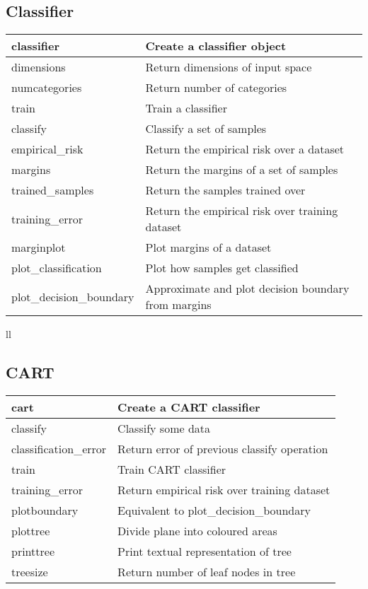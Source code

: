 \subsection{Classifier}

\begin{tabular}{ll}
\hline
classifier		& Create a classifier object \\
\hline	
dimensions		& Return dimensions of input space \\		
numcategories		& Return number of categories \\
\hline
train			& Train a classifier \\
classify		& Classify a set of samples \\
empirical\_risk		& Return the empirical risk over a dataset \\
margins			& Return the margins of a set of samples \\
\hline
trained\_samples		& Return the samples trained over \\
training\_error		& Return the empirical risk over training dataset \\
\hline
marginplot		& Plot margins of a dataset \\
plot\_classification	& Plot how samples get classified \\
plot\_decision\_boundary	& Approximate and plot decision boundary from margins \\
\hline
\end{tabular}{ll}


\subsection{CART}

\begin{tabular}{ll}
\hline
cart			& Create a CART classifier \\
\hline
classify		& Classify some data \\
classification\_error	& Return error of previous classify operation \\
\hline
train			& Train CART classifier \\
training\_error		& Return empirical risk over training dataset \\
\hline
plotboundary		& Equivalent to plot\_decision\_boundary \\
plottree		& Divide plane into coloured areas \\
printtree		& Print textual representation of tree \\
treesize		& Return number of leaf nodes in tree \\
\hline
\end{tabular}

